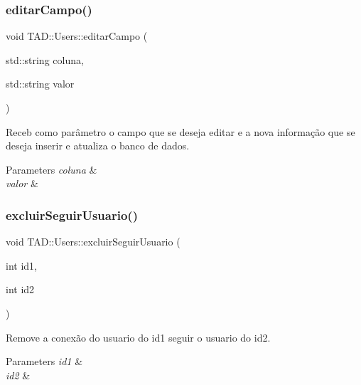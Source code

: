 \subsubsection{\texorpdfstring{editar\+Campo()}{editarCampo()}}
{\footnotesize\ttfamily void T\+A\+D\+::\+Users\+::editar\+Campo (\begin{DoxyParamCaption}\item[{std\+::string}]{coluna,  }\item[{std\+::string}]{valor }\end{DoxyParamCaption})}



Receb como parâmetro o campo que se deseja editar e a nova informação que se deseja inserir e atualiza o banco de dados. 


\begin{DoxyParams}{Parameters}
{\em coluna} & \\
\hline
{\em valor} & \\
\hline
\end{DoxyParams}
\mbox{\label{class_t_a_d_1_1_users_af1272c5f3545fffad21e12e1fc90cb6e}} 
\subsubsection{\texorpdfstring{excluir\+Seguir\+Usuario()}{excluirSeguirUsuario()}}
{\footnotesize\ttfamily void T\+A\+D\+::\+Users\+::excluir\+Seguir\+Usuario (\begin{DoxyParamCaption}\item[{int}]{id1,  }\item[{int}]{id2 }\end{DoxyParamCaption})}



Remove a conexão do usuario do id1 seguir o usuario do id2. 


\begin{DoxyParams}{Parameters}
{\em id1} & \\
\hline
{\em id2} & \\
\hline
\end{DoxyParams}
\mbox{\label{class_t_a_d_1_1_users_aa013811c11f18e5a6df0a4116908e82b}} 
